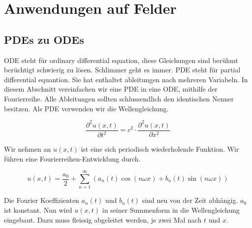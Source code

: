 %
%
%
%



\section{Anwendungen auf Felder\label{fourier:section:teil0}}


\subsection{PDEs zu ODEs\label{fourier:subsection:anwendungenFelder}}


ODE steht für ordinary differential equation, diese Gleichungen sind berühmt berüchtigt schwierig zu lösen.
Schlimmer geht es immer.
PDE steht für partial differential equantion. Sie hat enthaltet ableitungen nach mehreren Variabeln.
In diesem Abschnitt vereinfachen wir eine PDE in eine ODE, mithilfe der Fourierreihe.
Alle Ableitungen sollten schlussendlich den identischen Nenner besitzen.
Als PDE verwenden wir die Wellengleichung. 


\begin{equation}
	\frac{\partial^2 u(x, t)}{\partial t^2} = c^2 \cdot \frac{\partial^2 u(x, t)}{\partial x^2}
\end{equation}

Wir nehmen an $u(x, t)$ ist eine sich periodisch wiederholende Funktion. 
Wir führen eine Fourierreihen-Entwicklung durch. 

\begin{equation}
	u(x,t) = \frac{a_0}{2} + \sum_{n=1}^{\infty} \left( a_n(t) \cos(n \omega x) + b_n(t) \sin(n \omega x) \right)
\end{equation}

Die Fourier Koeffizienten $a_n(t)$ und $b_n(t)$ sind neu von der Zeit abhängig. 
$a_0$ ist konstant.
Nun wird $u(x,t)$ in seiner Summenform in die Wellengleichung eingebaut. 
Dazu muss fleissig abgeleitet werden, je zwei Mal nach $t$ und $x$.

